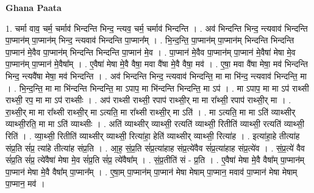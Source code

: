 \documentclass[17pt]{extarticle}
\begin{document}
\textbf{Ghana Paata } \newline

1. चर्मा वाव॒ चर्म॒ चर्माव॑ भिन्दन्ति भिन्द॒ न्त्यव॒ चर्म॒ चर्माव॑ भिन्दन्ति । . अव॑ भिन्दन्ति भिन्द॒ न्त्यवाव॑ भिन्दन्ति पा॒प्मान॑म् पा॒प्मान॑म् भिन्द॒ न्त्यवाव॑ भिन्दन्ति पा॒प्मान᳚म् । . भि॒न्द॒न्ति॒ पा॒प्मान॑म् पा॒प्मान॑म् भिन्दन्ति भिन्दन्ति पा॒प्मान॑ मे॒वैव पा॒प्मान॑म् भिन्दन्ति भिन्दन्ति पा॒प्मान॑ मे॒व । . पा॒प्मान॑ मे॒वैव पा॒प्मान॑म् पा॒प्मान॑ मे॒वैषा॑ मेषा मे॒व पा॒प्मान॑म् पा॒प्मान॑ मे॒वैषा᳚म् । . ए॒वैषा॑ मेषा मे॒वै वैषा॒ मवा वै॑षा मे॒वै वैषा॒ मव॑ । . ए॒षा॒ मवा वै॑षा मेषा॒ मव॑ भिन्दन्ति भिन्द॒ न्त्यवै॑षा मेषा॒ मव॑ भिन्दन्ति । . अव॑ भिन्दन्ति भिन्द॒ न्त्यवाव॑ भिन्दन्ति॒ मा मा भि॑न्द॒ न्त्यवाव॑ भिन्दन्ति॒ मा । . भि॒न्द॒न्ति॒ मा मा भि॑न्दन्ति भिन्दन्ति॒ मा ऽपाप॒ मा भि॑न्दन्ति भिन्दन्ति॒ मा ऽप॑ । . मा ऽपाप॒ मा मा ऽप॑ राथ्सी राथ्सी॒ रप॒ मा मा ऽप॑ राथ्सीः । . अप॑ राथ्सी राथ्सी॒ रपाप॑ राथ्सी॒र् मा मा रा᳚थ्सी॒ रपाप॑ राथ्सी॒र् मा । . रा॒थ्सी॒र् मा मा रा᳚थ्सी राथ्सी॒र् मा ऽत्यति॒ मा रा᳚थ्सी राथ्सी॒र् मा ऽति॑ । . मा ऽत्यति॒ मा मा ऽति॑ व्याथ्सीर् व्याथ्सी॒रति॒ मा मा ऽति॑ व्याथ्सीः । . अति॑ व्याथ्सीर् व्याथ्सी॒ रत्यति॑ व्याथ्सी॒ रितीति॑ व्याथ्सी॒ रत्यति॑ व्याथ्सी॒ रिति॑ । . व्या॒थ्सी॒ रितीति॑ व्याथ्सीर् व्याथ्सी॒ रित्या॑हा॒ हेति॑ व्याथ्सीर् व्याथ्सी॒ रित्या॑ह । . इत्या॑हा॒हे तीत्या॑ह संप्र॒ति सं॑प्र॒ त्या॑हे तीत्या॑ह संप्र॒ति । . आ॒ह॒ सं॒प्र॒ति सं॑प्र॒त्या॑हाह संप्र॒त्ये॑वैव सं॑प्र॒त्या॑हाह संप्र॒त्ये॑व । . सं॒प्र॒त्ये॑ वैव सं॑प्र॒ति सं॑प्र॒ त्ये॑वैषा॑ मेषा मे॒व सं॑प्र॒ति सं॑प्र॒ त्ये॑वैषा᳚म् । . सं॒प्र॒तीति॑ सं - प्र॒ति । . ए॒वैषा॑ मेषा मे॒वै वैषा᳚म् पा॒प्मान॑म् पा॒प्मान॑ मेषा मे॒वै वैषा᳚म् पा॒प्मान᳚म् । . ए॒षा॒म् पा॒प्मान॑म् पा॒प्मान॑ मेषा मेषाम् पा॒प्मान॒ मवाव॑ पा॒प्मान॑ मेषा मेषाम् पा॒प्मान॒ मव॑ । \newline
\end{document}
